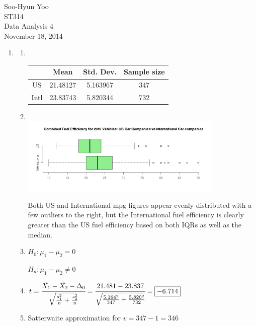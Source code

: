 \documentclass[12pt,letterpaper]{article}
\begin{document}
Soo-Hyun Yoo \\
ST314 \\
Data Analysis 4 \\
November 18, 2014

\begin{enumerate}
  \item
    \begin{enumerate}
      \item \hfill\\
        \begin{table}[!h]
          \centering
          \begin{tabular}{|c|c|c|c|} \hline
                 & Mean & Std. Dev. & Sample size \\ \hline
            US   & 21.48127 & 5.163967 & 347 \\ \hline
            Intl & 23.83743 & 5.820344 & 732 \\ \hline
          \end{tabular}
        \end{table}

      \item \hfill\\ \includegraphics[width=0.8\textwidth]{1b.png}

        Both US and International mpg figures appear evenly distributed with
        a few outliers to the right, but the International fuel efficiency is
        clearly greater than the US fuel efficiency based on both IQRs as well
        as the median.

      \item $H_0: \mu_1 - \mu_2 = 0$

        $H_a: \mu_1 - \mu_2 \ne 0$

      \item $t = \cfrac{\bar{X_1} - \bar{X_2} - \Delta_0}{\sqrt{\frac{s_1^2}{n}+\frac{s_2^2}{n}}} = \cfrac{21.481-23.837}{\sqrt{\frac{5.164^2}{347}+\frac{5.820^2}{732}}} = \boxed{-6.714}$

      \item Satterwaite approximation for $v = 347 - 1 = \boxed{346}$


\end{enumerate}
\end{enumerate}
\end{document}

